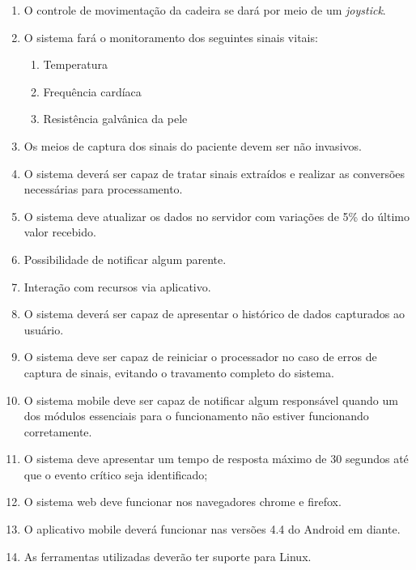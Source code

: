\begin{enumerate}[resume*]
  \item O controle de movimentação da cadeira se dará por meio de um \textit{joystick}.
  \item O sistema fará o monitoramento dos seguintes sinais vitais:
    \begin{enumerate}[resume*]
      \item Temperatura
      \item Frequência cardíaca
      \item Resistência galvânica da pele
    \end{enumerate}
  \item Os meios de captura dos sinais do paciente devem ser não invasivos.
  \item O sistema deverá ser capaz de tratar sinais extraídos e realizar as
    conversões necessárias para processamento.
  \item O sistema deve atualizar os dados no servidor com variações de 5\% do
    último valor recebido.
  \item Possibilidade de notificar algum parente.
  \item Interação com recursos via aplicativo.
  \item O sistema deverá ser capaz de apresentar o histórico de dados
    capturados ao usuário.
  \item O sistema deve ser capaz de reiniciar o processador no caso de erros de
    captura de sinais, evitando o travamento completo do sistema.
  \item O sistema mobile deve ser capaz de notificar algum responsável quando
    um dos módulos essenciais para o funcionamento não estiver funcionando corretamente.
  \item O sistema deve apresentar um tempo de resposta máximo de 30 segundos
    até que o evento crítico seja identificado;
  \item O sistema web deve funcionar nos navegadores chrome e firefox.
  \item O aplicativo mobile deverá funcionar nas versões 4.4 do Android em diante.
  \item As ferramentas utilizadas deverão ter suporte para Linux.
\end{enumerate}

